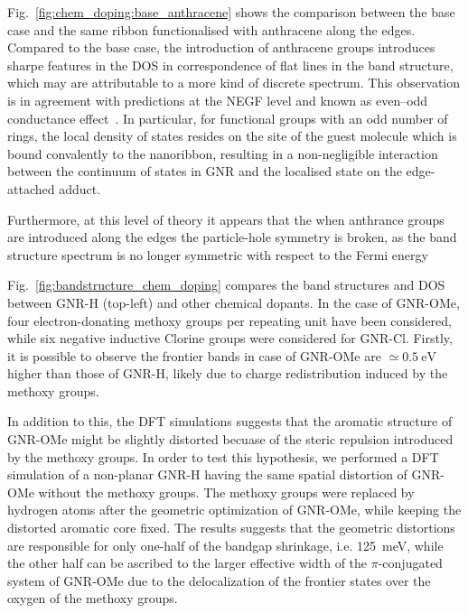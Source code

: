 Fig.~\ref{fig:chem_doping:base_anthracene} shows the comparison between the base case and the same ribbon functionalised with anthracene along the edges. Compared to the base case, the introduction of anthracene groups introduces sharpe features in the \gls{DOS} in correspondence of flat lines in the band structure, which may are attributable to a more kind of discrete spectrum. This observation is in agreement with predictions at the \gls{NEGF} level and known as even--odd conductance effect~\cite{vcercnevivcs2020even}. In particular, for functional groups with an odd number of rings, the local density of states resides on the site of the guest molecule which is bound convalently to the nanoribbon, resulting in a non-negligible interaction between the continuum of states in \gls{GNR} and the localised state on the edge-attached adduct.

Furthermore, at this level of theory it appears that the when anthrance groups are introduced along the edges the particle-hole symmetry is broken, as the band structure  spectrum is no longer symmetric with respect to the Fermi energy



Fig.~\ref{fig:bandstructure_chem_doping} compares the band structures and \gls{DOS} between GNR-H (top-left) and other chemical dopants. In the case of GNR-OMe, four electron-donating methoxy groups per repeating unit have been considered, while six negative inductive Clorine groups were considered for GNR-Cl. Firstly, it is possible to observe the frontier bands in case of GNR-OMe are $\simeq\SI{0.5}{\electronvolt}$ higher than those of GNR-H, likely due to charge redistribution induced by the methoxy groups.

In addition to this, the DFT simulations suggests that the aromatic structure of GNR-OMe might be slightly distorted becuase of the steric repulsion introduced by the methoxy groups. In order to test this hypothesis, we performed a DFT simulation of a non-planar GNR-H having the same spatial distortion of GNR-OMe without the methoxy groups. The methoxy groups were replaced by hydrogen atoms after the geometric optimization of GNR-OMe, while keeping the distorted aromatic core fixed. The results suggests that the geometric distortions are responsible for only one-half of the bandgap shrinkage, i.e. \SI{125}{\milli\electronvolt}, while the other half can be ascribed to the larger effective width of the $\pi$-conjugated system of GNR-OMe due to the delocalization of the frontier states over the oxygen of the methoxy groups.

